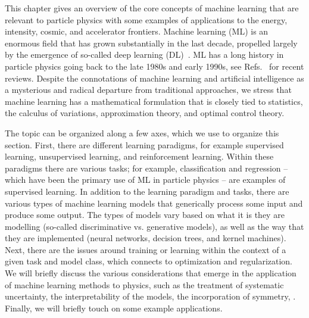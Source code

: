 
This chapter gives an overview of the core concepts of machine learning that are relevant to  particle physics with some examples of applications to the energy, intensity, cosmic, and accelerator frontiers. Machine learning (ML) is an enormous field that has grown substantially in the last decade, propelled largely by the emergence of so-called deep learning (DL)~\cite{lecun2015deep, schmidhuber2015deep}. ML has a long history in particle physics going back to the late 1980s and early 1990s, see Refs.~\cite{Radovic:2018dip,Guest:2018yhq,Carleo:2019ptp} for recent reviews. 
Despite the connotations of machine learning and artificial intelligence as a mysterious and radical departure from traditional approaches, we stress that machine learning has a mathematical formulation that is closely tied to statistics, the calculus of variations, approximation theory, and optimal control theory. %

The topic can be organized along a few axes, which we use to organize this section. First, there are different learning paradigms, for example supervised learning, unsupervised learning, and reinforcement learning. Within these paradigms there are various tasks; for example, classification and regression -- which have been the primary use of ML in particle physics -- are examples of supervised learning. In addition to the learning paradigm and tasks, there are various types of machine learning models that generically process some input and produce some output. The types of models vary based on what it is they are modelling (\eg so-called discriminative vs. generative models), as well as the way that they are implemented (\eg neural networks, decision trees, and kernel machines). Next, there are the issues around training or learning within the context of a given task and model class, which connects to optimization and regularization. 
We will briefly discuss the various considerations that emerge in the application of machine learning methods to physics, such as the treatment of systematic uncertainty, the interpretability of the models, the incorporation of symmetry, \etc. Finally, we will briefly touch on some example applications. 

